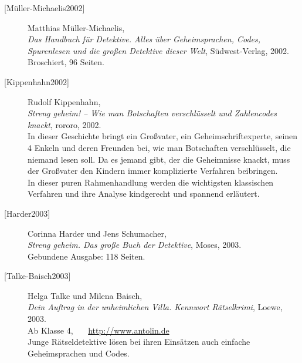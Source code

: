 \begin{description}
\item[\textrm{[Müller-Michaelis2002]}] 
    Matthias Müller-Michaelis, \\
    {\em Das Handbuch für Detektive. Alles über Geheimsprachen, Codes,
     Spurenlesen und die großen Detektive dieser Welt}, Südwest-Verlag, 2002.\\
    Broschiert, 96 Seiten.\\


\item[\textrm{[Kippenhahn2002]}] 
    Rudolf Kippenhahn, \\
    {\em Streng geheim! -- Wie man Botschaften verschlüsselt und
    Zahlencodes knackt}, rororo, 2002. \\
    In dieser Geschichte bringt ein Großvater, ein Geheimschriftexperte,
    seinen 4 Enkeln und deren Freunden bei, wie man Botschaften
    verschlüsselt, die niemand lesen soll. Da es jemand gibt, der die
    Geheimnisse knackt, muss der Großvater den Kindern immer komplizierte
    Verfahren beibringen. \\
    In dieser puren Rahmenhandlung werden die wichtigsten klassischen
    Verfahren und ihre Analyse kindgerecht und spannend erläutert.\\


\item[\textrm{[Harder2003]}] 
    Corinna Harder und Jens Schumacher, \\
    {\em Streng geheim. Das große Buch der Detektive}, Moses, 2003. \\
    Gebundene Ausgabe: 118 Seiten.\\


\item[\textrm{[Talke-Baisch2003]}] 
    Helga Talke und Milena Baisch, \\
    {\em Dein Auftrag in der unheimlichen Villa. Kennwort Rätselkrimi},
    Loewe, 2003. \\
    Ab Klasse 4, ~~~\url{http://www.antolin.de}\\
    Junge Rätseldetektive lösen bei ihren Einsätzen auch einfache
    Geheimsprachen und Codes.\\



\end{description}
